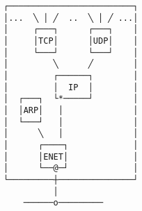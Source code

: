 \documentclass[varwidth,crop]{standalone}
\begin{document}
\begin{verbatim}
┌─────────────────────────┐
│...  ╲ │ ╱  ..  ╲ │ ╱ ...│
│     ┌───┐      ┌───┐    │
│     │TCP│      │UDP│    │
│     └───┘      └───┘    │
│         ╲      ╱        │
│         ┌──────┐        │
│         │  IP  │        │
│  ┌───┐  └*─────┘        │
│  │ARP│   │              │
│  └───┘   │              │
│      ╲   │              │
│      ┌────┐             │
│      │ENET│             │
│      └──@─┘             │
└─────────┼───────────────┘
          │
    ──────o─────────   
\end{verbatim}
\end{document}
